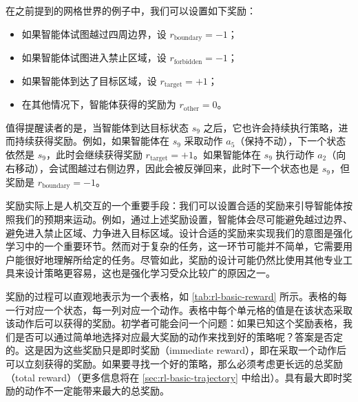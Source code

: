 在之前提到的网格世界的例子中，我们可以设置如下奖励：
\begin{itemize}
  \item 如果智能体试图越过四周边界，设 $r_{\mathrm{boundary}} = -1$；
  \item 如果智能体试图进入禁止区域，设 $r_{\mathrm{forbidden}} = -1$；
  \item 如果智能体到达了目标区域，设 $r_{\mathrm{target}} = +1$；
  \item 在其他情况下，智能体获得的奖励为 $r_{\mathrm{other}} = 0$。
\end{itemize}

值得提醒读者的是，当智能体到达目标状态 $s_9$ 之后，它也许会持续执行策略，进而持续获得奖励。例如，如果智能体在 $s_9$ 采取动作 $a_5$（保持不动），下一个状态依然是 $s_9$，此时会继续获得奖励 $r_{\mathrm{target}} = +1$。如果智能体在 $s_9$ 执行动作 $a_2$（向右移动），会试图越过右侧边界，因此会被反弹回来，此时下一个状态也是 $s_9$，但奖励是 $r_{\mathrm{boundary}} = -1$。

奖励实际上是人机交互的一个重要手段：我们可以设置合适的奖励来引导智能体按照我们的预期来运动。例如，通过上述奖励设置，智能体会尽可能避免越过边界、避免进入禁止区域、力争进入目标区域。设计合适的奖励来实现我们的意图是强化学习中的一个重要环节。然而对于复杂的任务，这一环节可能并不简单，它需要用户能很好地理解所给定的任务。尽管如此，奖励的设计可能仍然比使用其他专业工具来设计策略更容易，这也是强化学习受众比较广的原因之一。

奖励的过程可以直观地表示为一个表格，如 \cref{tab:rl-basic-reward} 所示。表格的每一行对应一个状态，每一列对应一个动作。表格中每个单元格的值是在该状态采取该动作后可以获得的奖励。初学者可能会问一个问题：如果已知这个奖励表格，我们是否可以通过简单地选择对应最大奖励的动作来找到好的策略呢？答案是否定的。这是因为这些奖励只是即时奖励（immediate reward），即在采取一个动作后可以立刻获得的奖励。如果要寻找一个好的策略，那么必须考虑更长远的总奖励（total reward）（更多信息将在 \cref{sec:rl-basic-trajectory} 中给出）。具有最大即时奖励的动作不一定能带来最大的总奖励。

